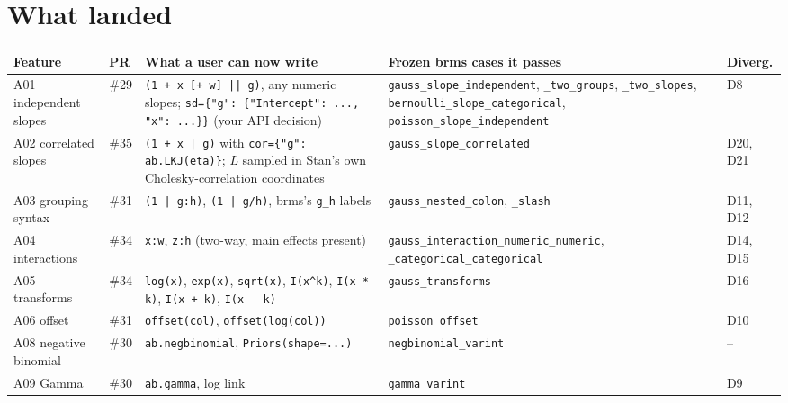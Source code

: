 \documentclass[11pt]{article}
\newcommand{\code}[1]{\texttt{#1}}
\begin{document}
\section{What landed}
\label{sec:landed}


\small
\begin{center}\begin{tabular}{@{}>{\raggedright\arraybackslash}p{}p{}>{\raggedright\arraybackslash}p{}>{\raggedright\arraybackslash}p{}>{\raggedright\arraybackslash}p{}@{}}
\toprule
Feature & PR & What a user can now write & Frozen brms cases it passes & Diverg. \\
\midrule
A01 independent slopes & \#29 & \code{(1 + x [+ w] || g)}, any numeric slopes; \code{sd=\{"g": \{"Intercept": ..., "x": ...\}\}} (your API decision) & \code{gauss\_\allowbreak{}slope\_\allowbreak{}independent}, \code{\_\allowbreak{}two\_\allowbreak{}groups}, \code{\_\allowbreak{}two\_\allowbreak{}slopes}, \code{bernoulli\_\allowbreak{}slope\_\allowbreak{}categorical}, \code{poisson\_\allowbreak{}slope\_\allowbreak{}independent} & D8 \\
A02 correlated slopes & \#35 & \code{(1 + x | g)} with \code{cor=\{"g": ab.LKJ(eta)\}}; $L$ sampled in Stan's own Cholesky-correlation coordinates & \code{gauss\_\allowbreak{}slope\_\allowbreak{}correlated} & D20, D21 \\
A03 grouping syntax & \#31 & \code{(1 | g:h)}, \code{(1 | g/h)}, brms's \code{g\_\allowbreak{}h} labels & \code{gauss\_\allowbreak{}nested\_\allowbreak{}colon}, \code{\_\allowbreak{}slash} & D11, D12 \\
A04 interactions & \#34 & \code{x:w}, \code{z:h} (two-way, main effects present) & \code{gauss\_\allowbreak{}interaction\_\allowbreak{}numeric\_\allowbreak{}numeric}, \code{\_\allowbreak{}categorical\_\allowbreak{}categorical} & D14, D15 \\
A05 transforms & \#34 & \code{log(x)}, \code{exp(x)}, \code{sqrt(x)}, \code{I(x\^{}k)}, \code{I(x * k)}, \code{I(x + k)}, \code{I(x - k)} & \code{gauss\_\allowbreak{}transforms} & D16 \\
A06 offset & \#31 & \code{offset(col)}, \code{offset(log(col))} & \code{poisson\_\allowbreak{}offset} & D10 \\
A08 negative binomial & \#30 & \code{ab.negbinomial}, \code{Priors(shape=...)} & \code{negbinomial\_\allowbreak{}varint} & -- \\
A09 Gamma & \#30 & \code{ab.gamma}, log link & \code{gamma\_\allowbreak{}varint} & D9 \\

\end{tabular}
\end{center}
\end{document}
